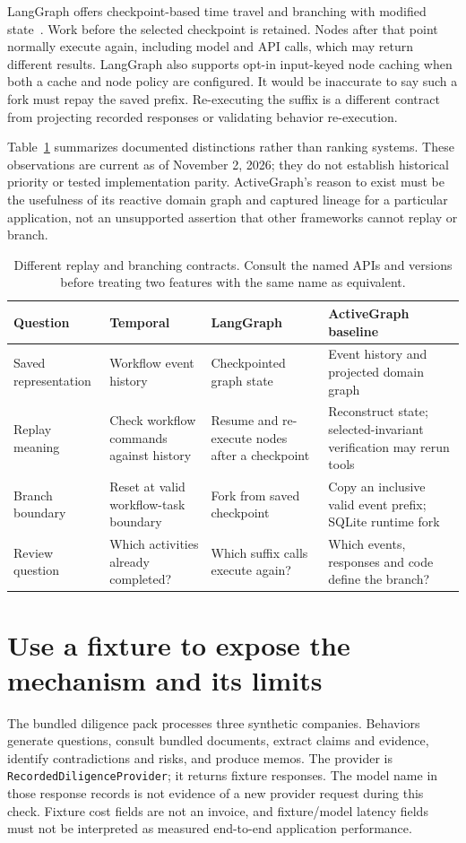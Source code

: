 \documentclass[11pt]{article}
\begin{document}
LangGraph offers checkpoint-based time travel and branching with modified state~\cite{langgraph}. Work before the selected checkpoint is retained. Nodes after that point normally execute again, including model and API calls, which may return different results. LangGraph also supports opt-in input-keyed node caching when both a cache and node policy are configured. It would be inaccurate to say such a fork must repay the saved prefix. Re-executing the suffix is a different contract from projecting recorded responses or validating behavior re-execution.

Table~\ref{tab:comparison} summarizes documented distinctions rather than ranking systems. These observations are current as of November 2, 2026; they do not establish historical priority or tested implementation parity. ActiveGraph's reason to exist must be the usefulness of its reactive domain graph and captured lineage for a particular application, not an unsupported assertion that other frameworks cannot replay or branch.

\begin{table}[t]
\centering\small
\begin{tabular}{>{\raggedright\arraybackslash}p{29mm}>{\raggedright\arraybackslash}p{33mm}>{\raggedright\arraybackslash}p{33mm}>{\raggedright\arraybackslash}p{38mm}}
\toprule
Question & Temporal & LangGraph & ActiveGraph baseline\\
\midrule
Saved representation & Workflow event history & Checkpointed graph state & Event history and projected domain graph\\[3pt]
Replay meaning & Check workflow commands against history & Resume and re-execute nodes after a checkpoint & Reconstruct state; selected-invariant verification may rerun tools\\[3pt]
Branch boundary & Reset at valid workflow-task boundary & Fork from saved checkpoint & Copy an inclusive valid event prefix; SQLite runtime fork\\[3pt]
Review question & Which activities already completed? & Which suffix calls execute again? & Which events, responses and code define the branch?\\
\bottomrule
\end{tabular}
\caption{Different replay and branching contracts. Consult the named APIs and versions before treating two features with the same name as equivalent.}
\label{tab:comparison}
\end{table}

\section*{Use a fixture to expose the mechanism and its limits}
The bundled diligence pack processes three synthetic companies. Behaviors generate questions, consult bundled documents, extract claims and evidence, identify contradictions and risks, and produce memos. The provider is \texttt{RecordedDiligenceProvider}; it returns fixture responses. The model name in those response records is not evidence of a new provider request during this check. Fixture cost fields are not an invoice, and fixture/model latency fields must not be interpreted as measured end-to-end application performance.
\end{document}
